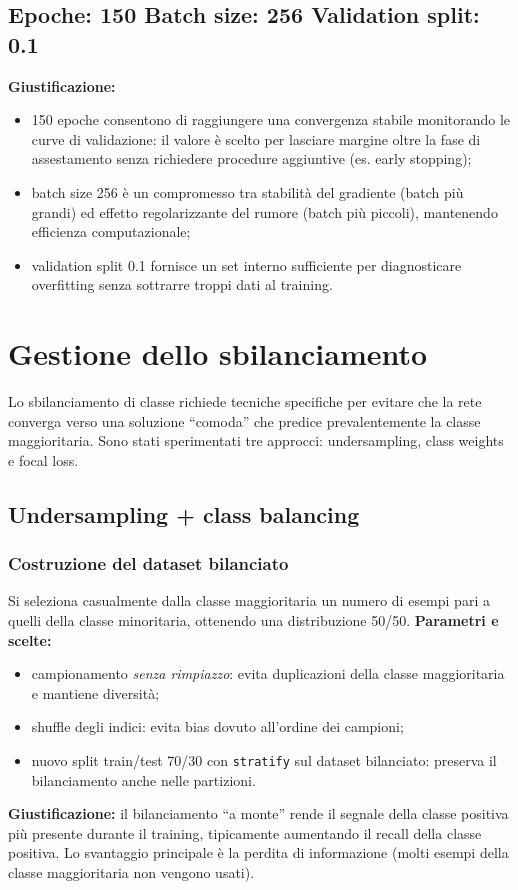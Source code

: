 \subsection{Epoche: 150 \;\;\; Batch size: 256 \;\;\; Validation split: 0.1}
\textbf{Giustificazione:}
\begin{itemize}
  \item 150 epoche consentono di raggiungere una convergenza stabile monitorando le curve di validazione: il valore è scelto per lasciare margine oltre la fase di assestamento senza richiedere procedure aggiuntive (es. early stopping);
  \item batch size 256 è un compromesso tra stabilità del gradiente (batch più grandi) ed effetto regolarizzante del rumore (batch più piccoli), mantenendo efficienza computazionale;
  \item validation split 0.1 fornisce un set interno sufficiente per diagnosticare overfitting senza sottrarre troppi dati al training.
\end{itemize}

\section{Gestione dello sbilanciamento}
Lo sbilanciamento di classe richiede tecniche specifiche per evitare che la rete converga verso una soluzione ``comoda'' che predice prevalentemente la classe maggioritaria.
Sono stati sperimentati tre approcci: undersampling, class weights e focal loss.

\subsection{Undersampling + class balancing}
\subsubsection{Costruzione del dataset bilanciato}
Si seleziona casualmente dalla classe maggioritaria un numero di esempi pari a quelli della classe minoritaria, ottenendo una distribuzione 50/50.
\textbf{Parametri e scelte:}
\begin{itemize}
  \item campionamento \emph{senza rimpiazzo}: evita duplicazioni della classe maggioritaria e mantiene diversità;
  \item shuffle degli indici: evita bias dovuto all'ordine dei campioni;
  \item nuovo split train/test 70/30 con \texttt{stratify} sul dataset bilanciato: preserva il bilanciamento anche nelle partizioni.
\end{itemize}
\textbf{Giustificazione:} il bilanciamento ``a monte'' rende il segnale della classe positiva più presente durante il training, tipicamente aumentando il recall della classe positiva.
Lo svantaggio principale è la perdita di informazione (molti esempi della classe maggioritaria non vengono usati).

